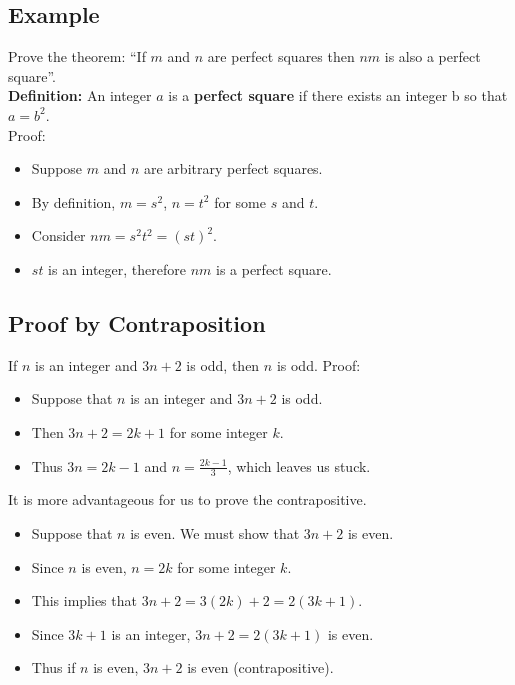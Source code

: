 \documentclass{math}
\begin{document}
\subsection*{Example}
Prove the theorem: ``If \( m \) and \( n \) are perfect squares then \( nm \)
is also a perfect square''. \\
\textbf{Definition:} An integer \( a \) is a \textbf{perfect square} if there
exists an integer b so that \( a = b^{2} \). \\
Proof:
\begin{itemize}
  \item Suppose \( m \) and \( n \) are arbitrary perfect squares.
  \item By definition, \( m = s^{2} \), \( n = t^{2} \) for some \( s \) and
    \( t \).
  \item Consider \( nm = s^{2}t^{2} = (st)^{2} \).
  \item \( st \) is an integer, therefore \( nm \) is a perfect square.
\end{itemize}

\subsection*{Proof by Contraposition}
If \( n \) is an integer and \( 3n+2 \) is odd, then \( n \) is odd. Proof:
\begin{itemize}
  \item Suppose that \( n \) is an integer and \( 3n+2 \) is odd.
  \item Then \( 3n+2 = 2k+1 \) for some integer \( k \).
  \item Thus \( 3n = 2k-1 \) and \( n = \frac{2k-1}{3} \), which leaves us
    stuck.
\end{itemize}
It is more advantageous for us to prove the contrapositive.
\begin{itemize}
  \item Suppose that \( n \) is even. We must show that \( 3n+2 \) is even.
  \item Since \( n \) is even, \( n = 2k \) for some integer \( k \).
  \item This implies that \( 3n+2 = 3(2k)+2 = 2(3k+1) \).
  \item Since \( 3k+1 \) is an integer, \( 3n+2 = 2(3k+1) \) is even.
  \item Thus if \( n \) is even, \( 3n+2 \) is even (contrapositive).
\end{itemize}
\end{document}
